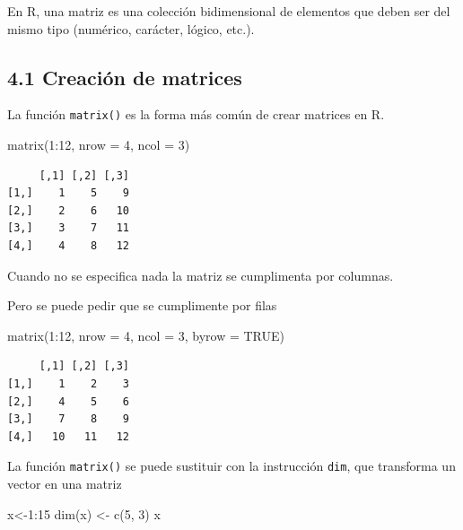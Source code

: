 \documentclass[
  letterpaper,
  DIV=11,
  numbers=noendperiod]{scrreprt}
\newenvironment{Shaded}{\begin{snugshade}}{\end{snugshade}}
\newcommand{\AttributeTok}[1]{\textcolor[rgb]{0.40,0.45,0.13}{#1}}
\newcommand{\ConstantTok}[1]{\textcolor[rgb]{0.56,0.35,0.01}{#1}}
\newcommand{\DecValTok}[1]{\textcolor[rgb]{0.68,0.00,0.00}{#1}}
\newcommand{\FunctionTok}[1]{\textcolor[rgb]{0.28,0.35,0.67}{#1}}
\newcommand{\NormalTok}[1]{\textcolor[rgb]{0.00,0.23,0.31}{#1}}
\newcommand{\OtherTok}[1]{\textcolor[rgb]{0.00,0.23,0.31}{#1}}
\newcommand{\SpecialCharTok}[1]{\textcolor[rgb]{0.37,0.37,0.37}{#1}}
\begin{document}
En R, una matriz es una colección bidimensional de elementos que deben
ser del mismo tipo (numérico, carácter, lógico, etc.).

\hypertarget{creaciuxf3n-de-matrices}{%
\subsection{4.1 Creación de matrices}\label{creaciuxf3n-de-matrices}}

La función \texttt{matrix()} es la forma más común de crear matrices en
R.

\begin{Shaded}
\begin{Highlighting}[]
\FunctionTok{matrix}\NormalTok{(}\DecValTok{1}\SpecialCharTok{:}\DecValTok{12}\NormalTok{, }\AttributeTok{nrow =} \DecValTok{4}\NormalTok{, }\AttributeTok{ncol =} \DecValTok{3}\NormalTok{)}
\end{Highlighting}
\end{Shaded}

\begin{verbatim}
     [,1] [,2] [,3]
[1,]    1    5    9
[2,]    2    6   10
[3,]    3    7   11
[4,]    4    8   12
\end{verbatim}

Cuando no se especifica nada la matriz se cumplimenta por columnas.

Pero se puede pedir que se cumplimente por filas

\begin{Shaded}
\begin{Highlighting}[]
\FunctionTok{matrix}\NormalTok{(}\DecValTok{1}\SpecialCharTok{:}\DecValTok{12}\NormalTok{, }\AttributeTok{nrow =} \DecValTok{4}\NormalTok{, }\AttributeTok{ncol =} \DecValTok{3}\NormalTok{, }\AttributeTok{byrow =} \ConstantTok{TRUE}\NormalTok{)}
\end{Highlighting}
\end{Shaded}

\begin{verbatim}
     [,1] [,2] [,3]
[1,]    1    2    3
[2,]    4    5    6
[3,]    7    8    9
[4,]   10   11   12
\end{verbatim}

La función \texttt{matrix()} se puede sustituir con la instrucción
\texttt{dim}, que transforma un vector en una matriz

\begin{Shaded}
\begin{Highlighting}[]
\NormalTok{x}\OtherTok{\textless{}{-}}\DecValTok{1}\SpecialCharTok{:}\DecValTok{15}
\FunctionTok{dim}\NormalTok{(x) }\OtherTok{\textless{}{-}} \FunctionTok{c}\NormalTok{(}\DecValTok{5}\NormalTok{, }\DecValTok{3}\NormalTok{)}
\NormalTok{x}
\end{Highlighting}
\end{Shaded}
\end{document}
